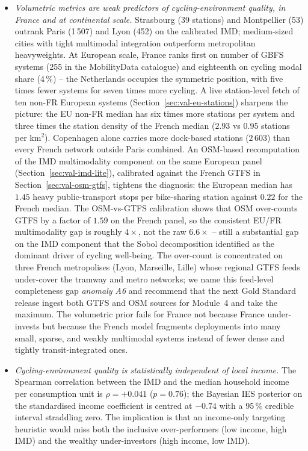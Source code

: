 \documentclass[11pt,a4paper]{article}
\begin{document}
\begin{itemize}
\item[\textbf{Q2.}] \emph{Volumetric metrics are weak predictors
of cycling-environment quality, in France and at continental
scale.} Strasbourg (39 stations) and Montpellier (53) outrank
Paris (1\,507) and Lyon (452) on the calibrated IMD;
medium-sized cities with tight multimodal integration outperform
metropolitan heavyweights. At European scale, France ranks first
on number of GBFS systems (255 in the MobilityData catalogue)
and eighteenth on cycling modal share (4\,\%) -- the Netherlands
occupies the symmetric position, with five times fewer systems
for seven times more cycling. A live station-level fetch of ten
non-FR European systems (Section~\ref{sec:val-eu-stations})
sharpens the picture: the EU non-FR median has six times more
stations per system and three times the station density of the
French median ($2.93$ vs $0.95$ stations per km$^{2}$).
Copenhagen alone carries more dock-based stations ($2\,603$)
than every French network outside Paris combined. An OSM-based
recomputation of the IMD multimodality component on the same
European panel (Section~\ref{sec:val-imd-lite}), calibrated
against the French GTFS in Section~\ref{sec:val-osm-gtfs},
tightens the diagnosis: the European median has $1.45$ heavy
public-transport stops per bike-sharing station against $0.22$
for the French median. The OSM-vs-GTFS calibration shows that
OSM over-counts GTFS by a factor of $1.59$ on the French panel,
so the consistent EU/FR multimodality gap is roughly
$4 \times$, not the raw $6.6 \times$ -- still a substantial gap
on the IMD component that the Sobol decomposition identified as
the dominant driver of cycling well-being. The over-count is
concentrated on three French metropolises (Lyon, Marseille,
Lille) whose regional GTFS feeds under-cover the tramway and
metro networks; we name this feed-level completeness gap
\emph{anomaly A6} and recommend that the next Gold Standard
release \citep{Fosse2026gold} ingest both GTFS and OSM sources
for Module~4 and take the maximum. The volumetric prior
fails for France not because France under-invests but because
the French model fragments deployments into many small, sparse,
and weakly multimodal systems instead of fewer dense and tightly
transit-integrated ones.

\item[\textbf{Q3.}] \emph{Cycling-environment quality is
statistically independent of local income.} The Spearman
correlation between the IMD and the median household income per
consumption unit is $\rho = +0.041$ ($p = 0.76$); the Bayesian
IES posterior on the standardised income coefficient is centred
at $-0.74$ with a 95\,\% credible interval straddling zero. The
implication is that an income-only targeting heuristic would miss
both the inclusive over-performers (low income, high IMD) and the
wealthy under-investors (high income, low IMD).


\end{itemize}
\end{document}
